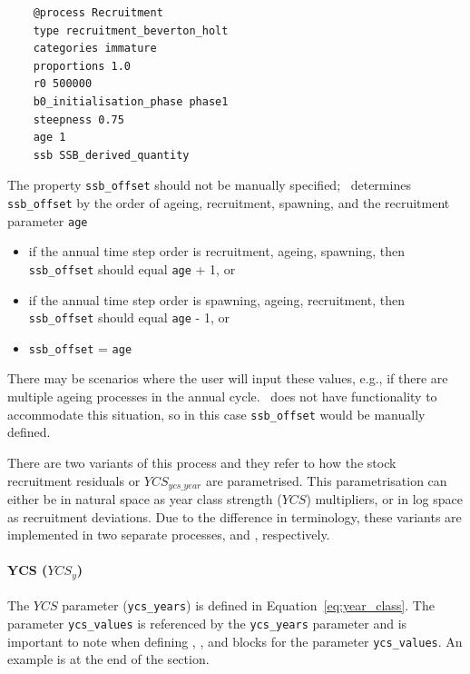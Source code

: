 {\small{\begin{verbatim}
	@process Recruitment
	type recruitment_beverton_holt
	categories immature
	proportions 1.0
	r0 500000
	b0_initialisation_phase phase1
	steepness 0.75
	age 1
	ssb SSB_derived_quantity

\end{verbatim}}}

The property \texttt{ssb\_offset} should not be manually specified; \CNAME\ determines \texttt{ssb\_offset} by the order of ageing, recruitment, spawning, and the recruitment parameter \texttt{age}

\begin{itemize}
	\item if the annual time step order is recruitment, ageing, spawning, then \texttt{ssb\_offset} should equal \texttt{age} + 1, or
	\item if the annual time step order is spawning, ageing, recruitment, then \texttt{ssb\_offset} should equal \texttt{age} - 1, or
	\item \texttt{ssb\_offset} = \texttt{age}
\end{itemize}

There may be scenarios where the user will input these values, e.g., if there are multiple ageing processes in the annual cycle. \CNAME\ does not have functionality to accommodate this situation, so in this case \texttt{ssb\_offset} would be manually defined.

There are two variants of this process and they refer to how the stock recruitment residuals or $YCS_{ycs\_year}$ are parametrised. This parametrisation can either be in natural space as year class strength ($YCS$) multipliers, or in log space as recruitment deviations. Due to the difference in terminology, these variants are implemented in two separate processes,  and , respectively.

\paragraph*{YCS ($YCS_y$)}

The $YCS$ parameter (\texttt{ycs\_years}) is defined in Equation~\eqref{eq:year_class}. The parameter \texttt{ycs\_values} is referenced by the \texttt{ycs\_years} parameter and is important to note when defining , , and  blocks for the parameter \texttt{ycs\_values}. An example is at the end of the section.


